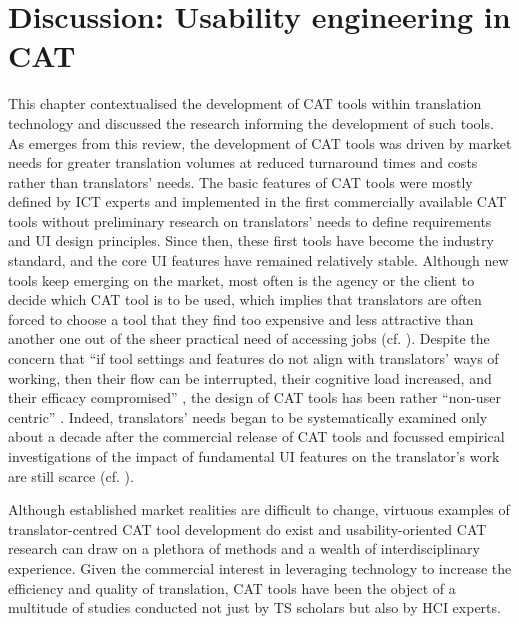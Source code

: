 \section{Discussion: Usability engineering in CAT}


This chapter contextualised the development of CAT tools within translation technology and discussed the research informing the development of such tools. As emerges from this review, the development of CAT tools was driven by market needs for greater translation volumes at reduced turnaround times and costs rather than translators’ needs. The basic features of CAT tools were mostly defined by ICT experts and implemented in the first commercially available CAT tools without preliminary research on translators’ needs to define requirements and UI design principles. Since then, these first tools have become the industry standard, and the core UI features have remained relatively stable. Although new tools keep emerging on the market, most often is the agency or the client to decide which CAT tool is to be used, which implies that translators are often forced to choose a tool that they find too expensive and less attractive than another one out of the sheer practical need of accessing jobs (cf. \cite{garcia2015computer}). Despite the concern that ``if tool settings and features do not align with translators’ ways of working, then their flow can be interrupted, their cognitive load increased, and their efficacy compromised'' \citep[2]{kappus2020ergonomics}, the design of CAT tools has been rather ``non-user centric'' \citep{moorkens2017assessing}. Indeed, translators’ needs began to be systematically examined only about a decade after the commercial release of CAT tools and focussed empirical investigations of the impact of fundamental UI features on the translator’s work are still scarce (cf. \cite{laubli2020machine}).

Although established market realities are difficult to change, virtuous examples of translator-centred CAT tool development do exist and usability-oriented CAT research can draw on a plethora of methods and a wealth of interdisciplinary experience. Given the commercial interest in leveraging technology to increase the efficiency and quality of translation, CAT tools have been the object of a multitude of studies conducted not just by TS scholars but also by HCI experts.

